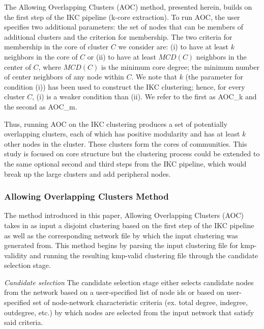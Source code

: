 \documentclass[12pt, oneside]{article}   	%
\begin{document}
	The Allowing Overlapping Clusters (AOC) method, presented herein, builds on the first step of the IKC pipeline (k-core extraction). To run AOC, the user specifies two additional parameters:  
	the set of nodes that can be members of  additional clusters and the criterion for membership.  The two criteria for membership in the core of cluster $C$ we consider are: (i) to have at least $k$ neighbors 
	in the core of $C$ or (ii) to have at least $MCD(C)$ neighbors in the center of $C$, where $MCD(C)$ is the minimum core degree; the minimum number of center neighbors of any node within $C$. 
	We note that $k$ (the parameter for condition (i)) has been used to construct the IKC clustering; hence, for every cluster $C$,  (i) is a weaker condition than (ii).
	We refer to the first as AOC\_k and the second as AOC\_m.
	
	Thus, running   AOC on the IKC clustering produces a set of potentially overlapping clusters, each of which has positive modularity and has at least $k$ other nodes in the cluster. These clusters form the cores of communities.  This study is focused on core structure but the clustering process could be extended to the same optional second and third steps from the IKC pipeline, which would break up the large clusters and add peripheral nodes. 
	
	\subsubsection{Allowing Overlapping Clusters Method}
	
	The method introduced in this paper, Allowing Overlapping Clusters (AOC) takes in as input a disjoint clustering based on the first step of the IKC pipeline as well as the corresponding network file by which the input clustering was generated from. This method begins by parsing the input clustering file for kmp-validity and running the resulting kmp-valid clustering file through the candidate selection stage. 
	
	\emph{Candidate selection} The candidate selection stage either selects candidate nodes from the network based on a user-specified list of node ids or based on user-specified set of node-network characteristic criteria (ex. total degree, indegree, outdegree, etc.) by which nodes are selected from the input network that satisfy said criteria. 
	
\end{document}
